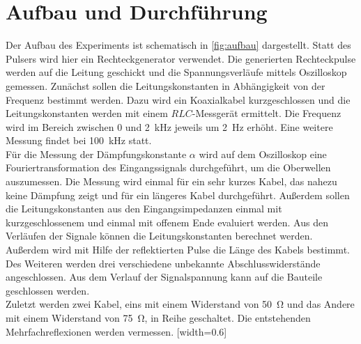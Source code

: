 \section {Aufbau und Durchführung}
\label{sec:durchführung}
Der Aufbau des Experiments ist schematisch in \autoref{fig:aufbau} dargestellt. Statt des Pulsers wird hier ein Rechteckgenerator verwendet. Die generierten Rechteckpulse werden auf die Leitung geschickt und die Spannungsverläufe mittels Oszilloskop gemessen.
Zunächst sollen die Leitungskonstanten in Abhängigkeit von der Frequenz bestimmt werden. Dazu wird ein Koaxialkabel kurzgeschlossen und die Leitungskonstanten werden mit einem $RLC$-Messgerät ermittelt. Die Frequenz wird im Bereich zwischen 0 und \SI{2}{\kilo\hertz} jeweils um \SI{2}{\hertz} erhöht. Eine weitere Messung findet bei \SI{100}{\kilo\hertz} statt. \\
Für die Messung der Dämpfungskonstante $\alpha$ wird auf dem Oszilloskop eine Fouriertransformation des Eingangssignals durchgeführt, um die Oberwellen auszumessen. Die Messung wird einmal für ein sehr kurzes Kabel, das nahezu keine Dämpfung zeigt und für ein längeres Kabel durchgeführt.
Außerdem sollen die Leitungskonstanten aus den Eingangsimpedanzen einmal mit kurzgeschlossenem und einmal mit offenem Ende evaluiert werden. Aus den Verläufen der Signale können die Leitungskonstanten berechnet werden. Außerdem wird mit Hilfe der reflektierten Pulse die Länge des Kabels bestimmt.\\
Des Weiteren werden drei verschiedene unbekannte Abschlusswiderstände angeschlossen. Aus dem Verlauf der Signalspannung kann auf die Bauteile geschlossen werden.\\
Zuletzt werden zwei Kabel, eins mit einem Widerstand von \SI{50}{\ohm} und das Andere mit einem Widerstand von \SI{75}{\ohm}, in Reihe geschaltet. Die entstehenden Mehrfachreflexionen werden vermessen.
[width=0.6\textwidth]
